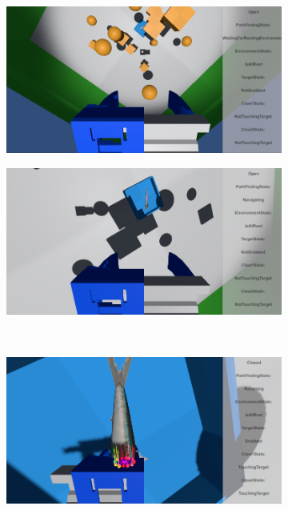 \begin{figure}
\centering
\begin{subfigure}[t]{0.5\textwidth}
\centering
\includegraphics[width=\linewidth]{figures/simulation/game-start}
\end{subfigure}%
    \hfill
\begin{subfigure}[t]{0.5\textwidth}
\centering
\includegraphics[width=\linewidth]{figures/simulation/game-mid}
\end{subfigure}
\\
\begin{subfigure}[t]{0.5\textwidth}
\centering
\includegraphics[width=\linewidth]{figures/simulation/grabbed}

\end{subfigure}
\end{figure}
